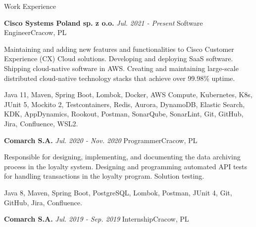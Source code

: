 \documentclass{resume}
\begin{document}

\begin{rSection}{Work Experience}

\begin{rSubsection}
    {\bf Cisco Systems Poland sp. z o.o.}
    {\em Jul. 2021 - Present}
    {\normalfont Software Engineer}{Cracow, PL}

    \item[] {Maintaining and adding new features and functionalities to Cisco Customer Experience (CX) Cloud solutions.
    Developing and deploying SaaS software. Shipping cloud-native software in AWS.
    Creating and maintaining large-scale distributed cloud-native technology stacks that achieve over 99.98\% uptime.}
    \item[] {Java 11, Maven, Spring Boot, Lombok, Docker, AWS Compute, Kubernetes, K8s, JUnit 5, Mockito 2, Testcontainers, Redis, Aurora, DynamoDB,
    Elastic Search, KDK, AppDynamics, Rookout, Postman, SonarQube, SonarLint, Git, GitHub, Jira, Confluence, WSL2.}

\end{rSubsection}

\begin{rSubsection}
    {\bf Comarch S.A.}
    {\em Jul. 2020 - Nov. 2020}
    {\normalfont Programmer}{Cracow, PL}

    \item[] {Responsible for designing, implementing, and documenting the data archiving process in the loyalty system. Designing and programming
    automated API tests for handling transactions in the loyalty program. Solution testing.}
    \item[] {Java 8, Maven, Spring Boot, PostgreSQL, Lombok, Postman, JUnit 4, Git, GitHub, Jira, Confluence.}

\end{rSubsection}

\begin{rSubsection}
    {\bf Comarch S.A.}
    {\em Jul. 2019 - Sep. 2019}
    {\normalfont Internship}{Cracow, PL}


\end{rSubsection}
\end{rSection}
\end{document}
